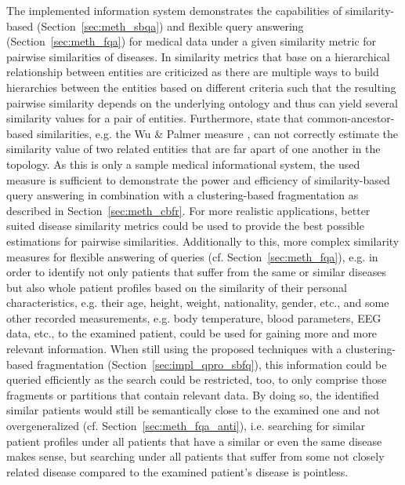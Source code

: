 The implemented information system demonstrates the capabilities of similarity-based (Section~\ref{sec:meth_sbqa}) and flexible query answering 
(Section~\ref{sec:meth_fqa}) for medical data under a given similarity metric for pairwise similarities of diseases. In \cite{Mathur2012} similarity metrics that
base on a hierarchical relationship between entities are criticized as there are multiple ways to build hierarchies between the entities based on different 
criteria such that the resulting pairwise similarity depends on the underlying ontology and thus can yield several similarity values for a pair of entities.
Furthermore, \cite{Mathur2012} state that common-ancestor-based similarities, e.g. the Wu \& Palmer measure \citep{Wu1994}, can not correctly estimate the
similarity value of two related entities that are far apart of one another in the topology. As this is only a sample medical informational system, the used
 measure \citep{McInnes2009} is sufficient to demonstrate the power and efficiency of similarity-based query answering in combination 
with a clustering-based fragmentation as described in Section~\ref{sec:meth_cbfr}. For more realistic applications, better suited disease similarity metrics 
could be used to provide the best possible estimations for pairwise similarities. Additionally to this, more complex similarity measures for flexible answering of 
queries (cf. Section~\ref{sec:meth_fqa}), e.g. in order to identify not only patients that suffer from the same or similar diseases but also whole patient profiles
based on the similarity of their personal characteristics, e.g. their age, height, weight, nationality, gender, etc., and some other recorded measurements, e.g.
body temperature, blood parameters, EEG data, etc., to the examined patient, could be used for gaining more and more relevant information. When still using the
proposed techniques with a clustering-based fragmentation (Section~\ref{sec:impl_qpro_sbfq}), this information could be queried efficiently as the search could 
be restricted, too, to only comprise those fragments or partitions that contain relevant data. By doing so, the identified similar patients would still be
semantically close to the examined one and not overgeneralized (cf. Section~\ref{sec:meth_fqa_anti}), i.e. searching for similar patient profiles under all 
patients that have a similar or even the same disease makes sense, but searching under all patients that suffer from some not closely related disease compared 
to the examined patient's disease is pointless.


